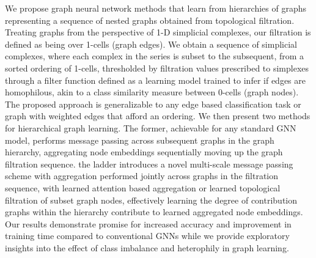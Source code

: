 We propose graph neural network methods that learn from hierarchies of graphs representing a sequence of nested graphs obtained from topological filtration. Treating graphs from the perspective of 1-D simplicial complexes, our filtration is defined as being over 1-cells (graph edges). We obtain a sequence of simplicial complexes, where each complex in the series is subset to the subsequent, from a sorted ordering of 1-cells, thresholded by filtration values prescribed to simplexes through a filter function defined as a learning model trained to infer if edges are homophilous, akin to a class similarity measure between 0-cells (graph nodes). The proposed approach is generalizable to any edge based classification task or graph with weighted edges that afford an ordering. We then present two methods for hierarchical graph learning. The former, achievable for any standard GNN model, performs message passing across subsequent graphs in the graph hierarchy, aggregating node embeddings sequentially moving up the graph filtration sequence. the ladder introduces a novel multi-scale message passing scheme with aggregation performed jointly across graphs in the filtration sequence, with learned attention based aggregation or learned topological filtration of subset graph nodes, effectively learning the degree of contribution graphs within the hierarchy contribute to learned aggregated node embeddings. Our results demonstrate promise for increased accuracy and improvement in training time compared to conventional GNNs while we provide exploratory insights into the effect of class imbalance and heterophily in graph learning. 
